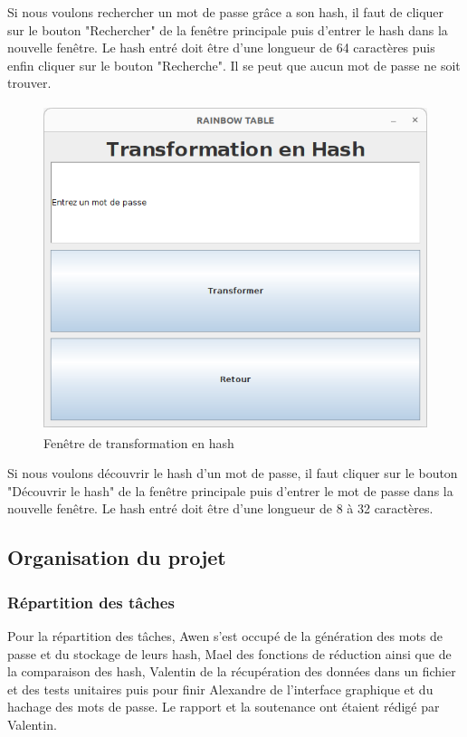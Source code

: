 \documentclass[a4paper,12pt]{article}
\begin{document}
    Si nous voulons rechercher un mot de passe grâce a son hash, il faut de cliquer sur le bouton "Rechercher" de la fenêtre principale puis d'entrer le hash dans la nouvelle fenêtre. Le hash entré doit être d'une longueur de 64 caractères puis enfin cliquer sur le bouton "Recherche". Il se peut que aucun mot de passe ne soit trouver.
    \begin{figure}[H]
    \centering
    \includegraphics[height=9.5cm]{img/interface_transformation.png}
    \caption{Fenêtre de transformation en hash}
    \end{figure}
    Si nous voulons découvrir le hash d'un mot de passe, il faut cliquer sur le bouton "Découvrir le hash" de la fenêtre principale puis d'entrer le mot de passe dans la nouvelle fenêtre. Le hash entré doit être d'une longueur de 8 à 32 caractères.

\subsection{Organisation du projet}
\subsubsection{Répartition des tâches}
Pour la répartition des tâches, Awen s'est occupé de la génération des mots de passe et du stockage de leurs hash, Mael des fonctions de réduction ainsi que de la comparaison des hash, Valentin de la récupération des données dans un fichier et des tests unitaires puis pour finir Alexandre de l'interface graphique et du hachage des mots de passe. Le rapport et la soutenance ont étaient rédigé par Valentin.
\end{document}
